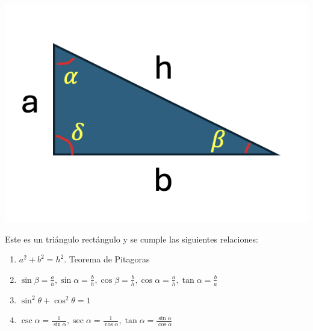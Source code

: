 \begin{frame}

\includegraphics[scale=.3]{trian}

Este es un triángulo rectángulo y se cumple las siguientes relaciones:
 
\begin{enumerate}
\item $a^2 + b^2 = h^2$. Teorema de Pitagoras
\item $\sin \beta = \frac{a}{h}, \sin \alpha = \frac{b}{h}, \cos \beta = \frac{b}{h}, \cos \alpha = 
\frac{a}{h}, \tan \alpha = \frac{b}{a}$
\item $\sin^2 \theta + \cos^2 \theta = 1$
\item $\csc \alpha = \frac{1}{\sin \alpha}, \sec \alpha = \frac{1}{\cos \alpha}, \tan \alpha = \frac{\sin 
\alpha}{\cos \alpha}$
\end{enumerate}
\end{frame}


